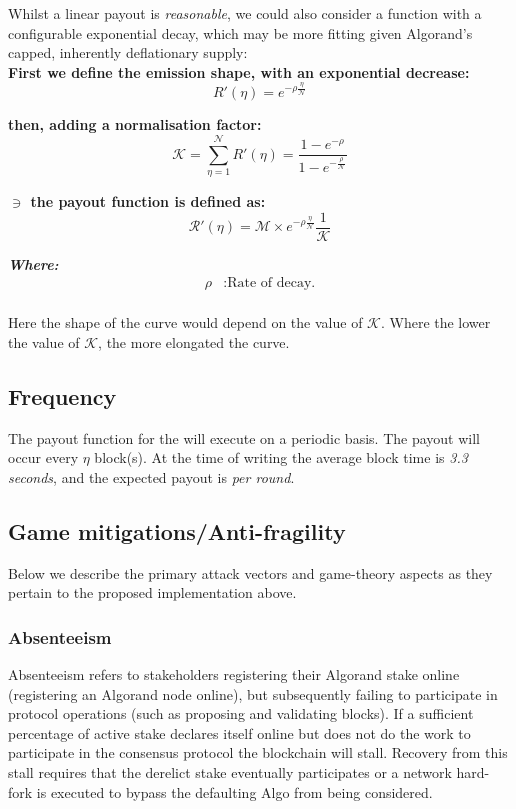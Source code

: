 \documentclass[11pt,a4paper]{article}
\begin{document}
Whilst a linear payout is \textit{reasonable}, we could also consider a function with a configurable exponential decay, which may 
be more fitting given Algorand's capped, inherently deflationary supply: \\ 

\textbf{First we define the emission shape, with an exponential decrease:}
\[
R'(\eta)= e^{-\rho\frac{\eta}{\mathcal{N}}}
\]

\textbf{then, adding a normalisation factor:}
\[
\mathcal{K} = \sum_{\eta=1}^\mathcal{N}R'(\eta)= \frac{1-e^{-\rho}}{1-e^{-\frac{\rho}{\mathcal{N}}}}
\]

\textbf{$\ni$ the payout function is defined as:}
\[
\mathcal{R'}(\eta)= \mathcal{M}\times e^{-\rho\frac{\eta}{\mathcal{N}}} \frac{1}{\mathcal{K}}
\]

\textbf{\emph{Where:}}
\begin{align*}
\rho & : \text{Rate of decay.} \\
\end{align*}


Here the shape of the curve would depend on the value of \(\mathcal{K}\). Where the lower the value of \(\mathcal{K}\), 
the more elongated the curve.

\subsection{Frequency}
The payout function for the  will execute on a periodic basis. The payout will occur every 
$\eta$ block(s). At the time of writing the average block time is \emph{3.3 seconds}, and the expected payout is 
\textit{per round}.

\subsection{Game mitigations/Anti-fragility}
Below we describe the primary attack vectors and game-theory aspects as they pertain to the proposed implementation 
above.

\subsubsection{Absenteeism} \label{subsubsec:absenteeism}
Absenteeism refers to stakeholders registering their Algorand stake online (registering an Algorand node online), but 
subsequently failing to participate in protocol operations (such as proposing and validating blocks). If a sufficient 
percentage of active stake declares itself online but does not do the work to participate in the consensus protocol the 
blockchain will stall. Recovery from this stall requires that the derelict stake eventually participates or a network 
hard-fork is executed to bypass the defaulting Algo from being considered. 
\end{document}
